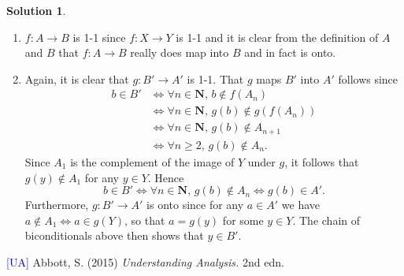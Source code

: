 \documentclass[12pt]{article}
\theoremstyle{definition}
\theoremstyle{exercise}
\theoremstyle{solution}
\newtheorem*{solution}{Solution}
\newcommand{\N}{\mathbf{N}}
\begin{document}
\begin{solution}
\begin{enumerate}
        \item \( f : A \to B \) is 1-1 since \( f : X \to Y \) is 1-1 and it is clear from the definition of \( A \) and \( B \) that \( f : A \to B \) really does map into \( B \) and in fact is onto.

        \item Again, it is clear that \( g : B' \to A' \) is 1-1. That \( g \) maps \( B' \) into \( A' \) follows since
        \begin{align*}
            b \in B' & \iff \forall n \in \N,\, b \not\in f(A_n) \\
            & \iff \forall n \in \N,\, g(b) \not\in g(f(A_n)) \tag{\( g \) is 1-1} \\
            & \iff \forall n \in \N,\, g(b) \not\in A_{n+1} \\
            & \iff \forall n \geq 2,\, g(b) \not\in A_n.
        \end{align*}
        Since \( A_1 \) is the complement of the image of \( Y \) under \( g \), it follows that \( g(y) \not\in A_1 \) for any \( y \in Y \). Hence
        \[
            b \in B' \iff \forall n \in \N,\, g(b) \not\in A_n \iff g(b) \in A'.
        \]
        Furthermore, \( g : B' \to A' \) is onto since for any \( a \in A' \) we have \( a \not\in A_1 \iff a \in g(Y) \), so that \( a = g(y) \) for some \( y \in Y \). The chain of biconditionals above then shows that \( y \in B' \).
    \end{enumerate}
\end{solution}

\noindent \hrulefill

\noindent \hypertarget{ua}{\textcolor{blue}{[UA]} Abbott, S. (2015) \textit{Understanding Analysis.} 2nd edn.}
\end{document}
